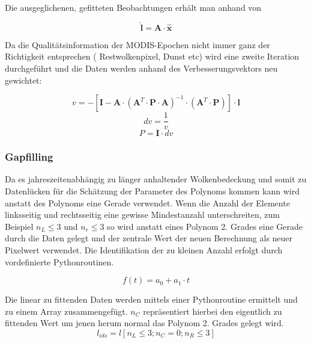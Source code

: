 \documentclass[11pt]{report}
\begin{document}
Die ausgeglichenen, gefitteten Beobachtungen erhält man anhand von

\begin{equation}
\widehat{\textbf{l}} = \textbf{A}\cdot\widehat{\textbf{x}}
\end{equation}\newline

Da die Qualitätsinformation der MODIS-Epochen nicht immer ganz der Richtigkeit entsprechen ( Restwolkenpixel, Dunst etc) wird eine zweite Iteration durchgeführt und die Daten werden anhand des Verbesserungsvektors neu gewichtet:

\begin{equation}
v=-\left[ \textbf{I}-\textbf{A}\cdot\left(\textbf{A}^T\cdot\textbf{P}\cdot\textbf{A}\right)^{-1}\cdot\left(\textbf{A}^T\cdot\textbf{P}\right)   \right]\cdot\textbf{l}
\end{equation}\newline
\begin{equation}
dv=\frac{1}{v}
\end{equation}
\begin{equation}
P=\textbf{I}\cdot dv
\end{equation}\newline

\subsubsection{Gapfilling}
Da es jahreszeitenabhängig zu länger anhaltender Wolkenbedeckung und somit zu Datenlücken für die Schätzung der Parameter des Polynoms kommen kann wird anstatt des Polynoms eine Gerade verwendet. Wenn die Anzahl der Elemente linksseitig und rechtsseitig eine gewisse Mindestanzahl unterschreiten, zum Beispiel $n_L \leq 3$ und $n_r \leq 3$ so wird anstatt eines Polynom 2. Grades eine Gerade durch die Daten gelegt und der zentrale Wert der neuen Berechnung als neuer Pixelwert verwendet. Die Identifikation der zu kleinen Anzahl erfolgt durch vordefinierte Pythonroutinen.

\begin{equation}
f(t) = a_0 + a_1 \cdot t
\end{equation}\newline

Die linear zu fittenden Daten werden mittels einer Pythonroutine ermittelt und zu einem Array zusammengefügt. $n_C$ repräsentiert hierbei den eigentlich zu fittenden Wert um jenen herum normal das Polynom 2. Grades gelegt wird.
\begin{equation}
l_{ids} = l[n_L\leq 3;n_C=0;n_R\leq3]
\end{equation}\newline
\end{document}
